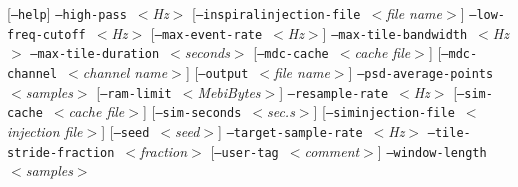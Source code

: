 \documentclass{article}
\newcommand{\option}[1]{\texttt{#1}}
\newcommand{\parm}[1]{$<$\textit{#1}$>$}
\newenvironment{entry}%
  {\begin{list}{}{\renewcommand{\makelabel}[1]%
    {\parbox[b]{\labelwidth}{\makebox[0pt][l]{\textbf{##1}}\\}}%
    \setlength{\labelwidth}{1em}%
    \setlength{\labelsep}{1em}%
    \setlength{\leftmargin}{2em}%
    \setlength{\topsep}{\medskipamount}%
    \setlength{\itemsep}{\medskipamount}%
    \setlength{\parsep}{\medskipamount}%
    \setlength{\listparindent}{0pt}}}
  {\end{list}}
\begin{document}
\begin{entry}
[\option{--help}] \newline \hspace*{0.5in}
\option{--high-pass}~\parm{Hz} \newline \hspace*{0.5in}
[\option{--inspiralinjection-file}~\parm{file name}] \newline \hspace*{0.5in}
\option{--low-freq-cutoff}~\parm{Hz} \newline \hspace*{0.5in}
[\option{--max-event-rate}~\parm{Hz}] \newline \hspace*{0.5in}
\option{--max-tile-bandwidth}~\parm{Hz} \newline \hspace*{0.5in}
\option{--max-tile-duration}~\parm{seconds} \newline \hspace*{0.5in}
[\option{--mdc-cache}~\parm{cache file}] \newline \hspace*{0.5in}
[\option{--mdc-channel}~\parm{channel name}] \newline \hspace*{0.5in}
[\option{--output}~\parm{file name}] \newline \hspace*{0.5in}
\option{--psd-average-points}~\parm{samples} \newline \hspace*{0.5in}
[\option{--ram-limit}~\parm{MebiBytes}] \newline \hspace*{0.5in}
\option{--resample-rate}~\parm{Hz} \newline \hspace*{0.5in}
[\option{--sim-cache}~\parm{cache file}] \newline \hspace*{0.5in}
[\option{--sim-seconds}~\parm{sec.s}] \newline \hspace*{0.5in}
[\option{--siminjection-file}~\parm{injection file}] \newline \hspace*{0.5in}
[\option{--seed}~\parm{seed}] \newline \hspace*{0.5in}
\option{--target-sample-rate}~\parm{Hz} \newline \hspace*{0.5in}
\option{--tile-stride-fraction}~\parm{fraction} \newline \hspace*{0.5in}
[\option{--user-tag}~\parm{comment}] \newline \hspace*{0.5in}
\option{--window-length}~\parm{samples} \newline \hspace*{0.5in}


\end{entry}
\end{document}
